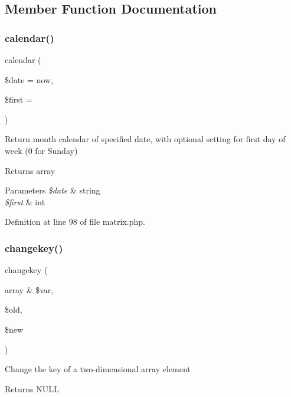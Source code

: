 \subsection{Member Function Documentation}
\hypertarget{class_matrix_a265458287034dc5692c5890daffd799b}{}\label{class_matrix_a265458287034dc5692c5890daffd799b} 
\subsubsection{\texorpdfstring{calendar()}{calendar()}}
{\footnotesize\ttfamily calendar (\begin{DoxyParamCaption}\item[{}]{\$date = {\ttfamily \textquotesingle{}now\textquotesingle{}},  }\item[{}]{\$first = {} }\end{DoxyParamCaption})}

Return month calendar of specified date, with optional setting for first day of week (0 for Sunday) \begin{DoxyReturn}{Returns}
array 
\end{DoxyReturn}

\begin{DoxyParams}{Parameters}
{\em \$date} & string \\
\hline
{\em \$first} & int \\
\hline
\end{DoxyParams}


Definition at line 98 of file matrix.\+php.

\hypertarget{class_matrix_aac5852b6570ed382e8c3c42e6edb9e8b}{}\label{class_matrix_aac5852b6570ed382e8c3c42e6edb9e8b} 
\subsubsection{\texorpdfstring{changekey()}{changekey()}}
{\footnotesize\ttfamily changekey (\begin{DoxyParamCaption}\item[{array \&}]{\$var,  }\item[{}]{\$old,  }\item[{}]{\$new }\end{DoxyParamCaption})}

Change the key of a two-\/dimensional array element \begin{DoxyReturn}{Returns}
N\+U\+LL 
\end{DoxyReturn}

